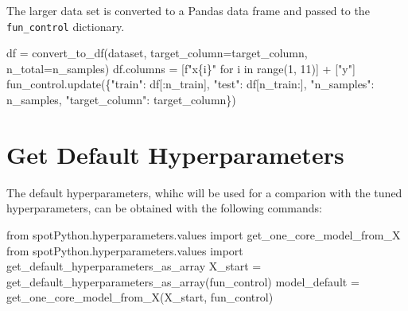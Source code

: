 \documentclass[
  letterpaper,
  DIV=11,
  numbers=noendperiod]{scrreprt}
\newenvironment{Shaded}{\begin{snugshade}}{\end{snugshade}}
\newcommand{\BuiltInTok}[1]{\textcolor[rgb]{0.00,0.23,0.31}{#1}}
\newcommand{\ControlFlowTok}[1]{\textcolor[rgb]{0.00,0.23,0.31}{#1}}
\newcommand{\DecValTok}[1]{\textcolor[rgb]{0.68,0.00,0.00}{#1}}
\newcommand{\ImportTok}[1]{\textcolor[rgb]{0.00,0.46,0.62}{#1}}
\newcommand{\KeywordTok}[1]{\textcolor[rgb]{0.00,0.23,0.31}{#1}}
\newcommand{\NormalTok}[1]{\textcolor[rgb]{0.00,0.23,0.31}{#1}}
\newcommand{\OperatorTok}[1]{\textcolor[rgb]{0.37,0.37,0.37}{#1}}
\newcommand{\SpecialCharTok}[1]{\textcolor[rgb]{0.37,0.37,0.37}{#1}}
\newcommand{\SpecialStringTok}[1]{\textcolor[rgb]{0.13,0.47,0.30}{#1}}
\newcommand{\StringTok}[1]{\textcolor[rgb]{0.13,0.47,0.30}{#1}}
\begin{document}
The larger data set is converted to a Pandas data frame and passed to
the \texttt{fun\_control} dictionary.

\begin{Shaded}
\begin{Highlighting}[]
\NormalTok{df }\OperatorTok{=}\NormalTok{ convert\_to\_df(dataset, target\_column}\OperatorTok{=}\NormalTok{target\_column, n\_total}\OperatorTok{=}\NormalTok{n\_samples)}
\NormalTok{df.columns }\OperatorTok{=}\NormalTok{ [}\SpecialStringTok{f"x}\SpecialCharTok{\{}\NormalTok{i}\SpecialCharTok{\}}\SpecialStringTok{"} \ControlFlowTok{for}\NormalTok{ i }\KeywordTok{in} \BuiltInTok{range}\NormalTok{(}\DecValTok{1}\NormalTok{, }\DecValTok{11}\NormalTok{)] }\OperatorTok{+}\NormalTok{ [}\StringTok{"y"}\NormalTok{]}
\NormalTok{fun\_control.update(\{}\StringTok{"train"}\NormalTok{: df[:n\_train],}
                    \StringTok{"test"}\NormalTok{: df[n\_train:],}
                    \StringTok{"n\_samples"}\NormalTok{: n\_samples,}
                    \StringTok{"target\_column"}\NormalTok{: target\_column\})}
\end{Highlighting}
\end{Shaded}

\hypertarget{get-default-hyperparameters-5}{%
\section{Get Default
Hyperparameters}\label{get-default-hyperparameters-5}}

The default hyperparameters, whihc will be used for a comparion with the
tuned hyperparameters, can be obtained with the following commands:

\begin{Shaded}
\begin{Highlighting}[]
\ImportTok{from}\NormalTok{ spotPython.hyperparameters.values }\ImportTok{import}\NormalTok{ get\_one\_core\_model\_from\_X}
\ImportTok{from}\NormalTok{ spotPython.hyperparameters.values }\ImportTok{import}\NormalTok{ get\_default\_hyperparameters\_as\_array}
\NormalTok{X\_start }\OperatorTok{=}\NormalTok{ get\_default\_hyperparameters\_as\_array(fun\_control)}
\NormalTok{model\_default }\OperatorTok{=}\NormalTok{ get\_one\_core\_model\_from\_X(X\_start, fun\_control)}
\end{Highlighting}
\end{Shaded}
\end{document}
